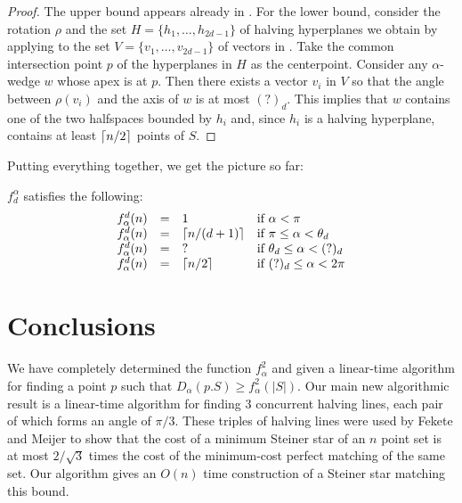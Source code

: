 \documentclass[lotsofwhite]{patmorin}
\newcommand{\crap}[1]{(?)_d}
\begin{document}
\begin{proof}
The upper bound appears already in .  For the lower
bound, consider the rotation $\rho$ and the set $H=\{h_1,\ldots,h_{2d-1}\}$ of halving
hyperplanes we obtain by applying  to the set
$V=\{v_1,\ldots,v_{2d-1}\}$ of
vectors in .  Take the common intersection point $p$
of the hyperplanes in $H$ as the centerpoint. Consider any
$\alpha$-wedge $w$ whose apex is at $p$.  Then there exists a vector $v_i$ in
$V$ so that the angle between $\rho(v_i)$ and the axis of $w$ is at most
$\crap{d}$.  This implies that $w$ contains one of the two halfspaces
bounded by $h_i$ and, since $h_i$ is a halving hyperplane, contains at
least $\left\lceil n/2 \right\rceil$ points of $S$. 
\end{proof}

Putting everything together, we get the picture so far:

\begin{lem}
$f^\alpha_d$ satisfies the following:
\[\begin{array}{lcll}
  f^d_\alpha(n) & = & 1 & \mbox{if $\alpha < \pi$} \\
  f^d_\alpha(n) & = & \ceil{n/(d+1)} & \mbox{if $\pi \le \alpha < \theta_d$} \\
  f^d_\alpha(n) & = & ? & \mbox{if $\theta_d \le \alpha < \crap{d}$} \\
  f^d_\alpha(n) & = & \ceil{n/2} & \mbox{if $\crap{d}\le \alpha < 2\pi$} \\
\end{array}\]
\end{lem}





\section{Conclusions}

We have completely determined the function $f^2_\alpha$ and given a
linear-time algorithm for finding a point $p$ such that
$D_\alpha(p.S)\ge f^2_\alpha(|S|)$.  Our main new algorithmic result
is a linear-time algorithm for finding 3 concurrent halving lines,
each pair of which forms an angle of $\pi/3$.  These triples of
halving lines were used by Fekete and Meijer to show that the cost of
a minimum Steiner star of an $n$ point set is at most $2/\sqrt{3}$
times the cost of the minimum-cost perfect matching of the same set.
Our algorithm gives an $O(n)$ time construction of a Steiner star
matching this bound.
\end{document}
